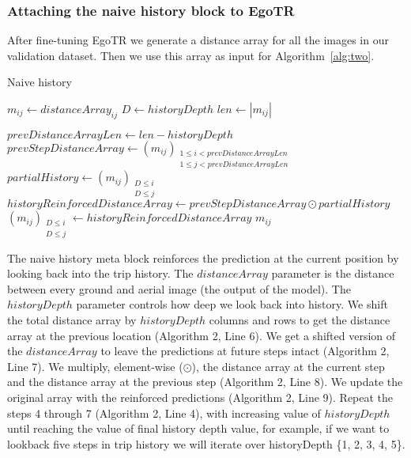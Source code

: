 \documentclass[10pt,letterpaper]{article}
\begin{document}
\subsubsection*{Attaching the naive history block to EgoTR}
After fine-tuning EgoTR we generate a distance array for all the images in our validation dataset. Then we use this array as input for Algorithm~\ref{alg:two}.

\begin{algorithm}[H]
  \label{algorithm2}
  \caption{Naive history}\label{alg:two}
  $m_{ij} \gets distanceArray_{ij}$\;
  $D \gets historyDepth$\;
  $len \gets |m_{ij}|$\;
  
   {
      $prevDistanceArrayLen \gets len - historyDepth$\;
      $prevStepDistanceArray \gets (m_{ij})_{\substack{1\le i < prevDistanceArrayLen \\ 1\le j < prevDistanceArrayLen }}$\;
      $partialHistory \gets (m_{ij})_{\substack{D \le i \\ D \le j}}$\;
      $historyReinforcedDistanceArray \gets prevStepDistanceArray \odot partialHistory$\;
      $(m_{ij})_{\substack{D \le i \\ D \le j}} \gets historyReinforcedDistanceArray$\;
  }
  \Return $m_{ij}$\;
\end{algorithm}


The naive history meta block reinforces the prediction at the current position by looking back into the trip history. The $distanceArray$ parameter is the distance between every ground and aerial image (the output of the model).  The $historyDepth$ parameter controls how deep we look back into history. We shift the total distance array by $historyDepth$ columns and rows to get the distance array at the previous location (Algorithm 2, Line 6). We get a shifted version of the $distanceArray$ to leave the predictions at future steps intact (Algorithm 2, Line 7).  We multiply, element-wise ($\odot$), the distance array at the current step and the distance array at the previous step (Algorithm 2, Line 8). We update the original array with the reinforced predictions (Algorithm 2, Line 9). Repeat the steps 4 through 7 (Algorithm 2, Line 4), with increasing value of $historyDepth$ until reaching the value of final history depth value, for example, if we want to lookback five steps in trip history we will iterate over historyDepth  \{1, 2, 3, 4, 5\}.
\end{document}

